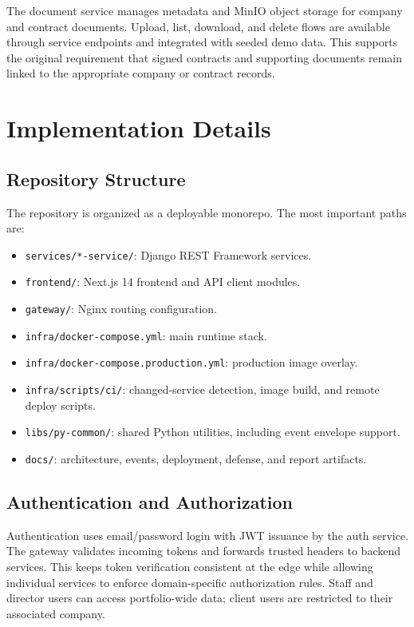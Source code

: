 \documentclass[12pt,a4paper]{report}
\begin{document}
The document service manages metadata and MinIO object storage for company and
contract documents. Upload, list, download, and delete flows are available
through service endpoints and integrated with seeded demo data. This supports the
original requirement that signed contracts and supporting documents remain linked
to the appropriate company or contract records.

\chapter{Implementation Details}
\label{ch:implementation-details}

\section{Repository Structure}
\label{sec:repo-structure}

The repository is organized as a deployable monorepo. The most important paths
are:
\begin{itemize}
  \item \texttt{services/*-service/}: Django REST Framework services.
  \item \texttt{frontend/}: Next.js 14 frontend and API client modules.
  \item \texttt{gateway/}: Nginx routing configuration.
  \item \texttt{infra/docker-compose.yml}: main runtime stack.
  \item \texttt{infra/docker-compose.production.yml}: production image overlay.
  \item \texttt{infra/scripts/ci/}: changed-service detection, image build, and
  remote deploy scripts.
  \item \texttt{libs/py-common/}: shared Python utilities, including event
  envelope support.
  \item \texttt{docs/}: architecture, events, deployment, defense, and report
  artifacts.
\end{itemize}

\section{Authentication and Authorization}
\label{sec:auth-authorization}

Authentication uses email/password login with JWT issuance by the auth service.
The gateway validates incoming tokens and forwards trusted headers to backend
services. This keeps token verification consistent at the edge while allowing
individual services to enforce domain-specific authorization rules. Staff and
director users can access portfolio-wide data; client users are restricted to
their associated company.
\end{document}
